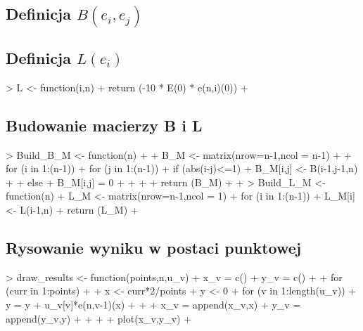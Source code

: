 \documentclass{article}
\begin{document}
\subsection{Definicja \(B(e_i,e_j)\)}

\begin{Schunk}
\end{Schunk}

\subsection{Definicja \(L(e_i)\)}

\begin{Schunk}
\begin{Sinput}
> L <- function(i,n){
+   return (-10 * E(0) * e(n,i)(0))
+ }
\end{Sinput}
\end{Schunk}
\subsection{Budowanie macierzy B i L}
\begin{Schunk}
\begin{Sinput}
> Build_B_M <- function(n){
+ 
+ B_M <- matrix(nrow=n-1,ncol = n-1)
+ 
+ for (i in 1:(n-1))
+   for (j in 1:(n-1)){
+     if (abs(i-j)<=1){
+       B_M[i,j] <- B(i-1,j-1,n)
+     }
+     else{
+       B_M[i,j] = 0
+     }
+     
+   }
+   return (B_M)
+ 
+ }
> Build_L_M <- function(n){
+   L_M <- matrix(nrow=n-1,ncol = 1)
+   for (i in 1:(n-1))
+     L_M[i] <- L(i-1,n)
+   return (L_M)
+ }
\end{Sinput}
\end{Schunk}

\subsection{Rysowanie wyniku w postaci punktowej}

\begin{Schunk}
\begin{Sinput}
> draw_results <- function(points,n,u_v){
+ x_v = c()
+ y_v = c()
+ 
+ for (curr in 1:points){
+   
+   x <- curr*2/points
+   y <- 0
+   for (v in 1:length(u_v)){
+     y = y + u_v[v]*e(n,v-1)(x)
+   }
+   
+   x_v = append(x_v,x)
+   y_v = append(y_v,y)
+ 
+   
+ }
+  plot(x_v,y_v)
+ }
\end{Sinput}
\end{Schunk}
\end{document}

